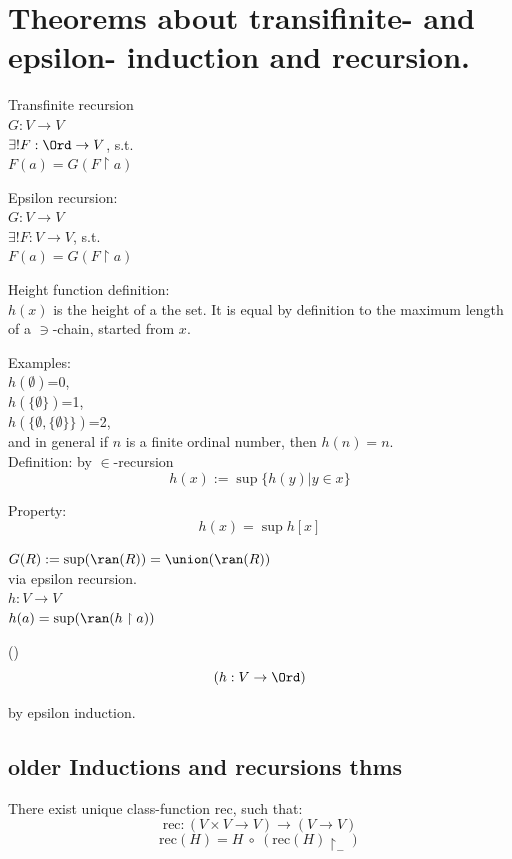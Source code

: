 \def\topic{Induction \& Recursion}





\section{Theorems about transifinite- and epsilon- induction and recursion.}

\begin{recall}
Transfinite recursion\\
$G:V\to V$\\
$\exists! F:\Ord\to V$, s.t.\\
$F(a) = G(F\restriction a)$\\
\end{recall}
\begin{recall}
Epsilon recursion:\\
$G:V\to V$\\
$\exists! F:V\to V$, s.t.\\
$F(a) = G(F\restriction a)$\\
\end{recall}

\begin{definition}
Height function definition:\\
$h(x)$ is the height of a the set. It is equal by definition to the maximum length of a $\ni$-chain, started from $x$.\\
\end{definition}

Examples:\\
$h(\emptyset)$=0,\\
$h(\{\emptyset\})$=1,\\
$h(\{\emptyset,\{\emptyset\}\})$=2,\\
and in general if $n$ is a finite ordinal number, then $h(n)=n$.\\
Definition: by $\in$-recursion
\[
h(x) := \sup \{ h(y) | y \in x\}
\]

Property:
\[
h(x) = \sup h[x]
\]

$G(R) := \sup(\ran(R)) = \union(\ran(R))$\\
via epsilon recursion.\\
$h : V\to V$\\
$h(a) = \sup(\ran(h\restriction a) )$\\



\begin{lemma}()
\[
(h:V\to\Ord)
\]
\end{lemma}
\Proof
by epsilon induction.\\
\Done

\subsection{older Inductions and recursions thms}%
There exist unique class-function rec, such that:
\[
\mbox{rec}:(V\times V\to V)\to(V\to V)
\]
\[
\mbox{rec}(H) = H\ \circ\ (\mbox{rec}(H)\restriction_-)
\]
